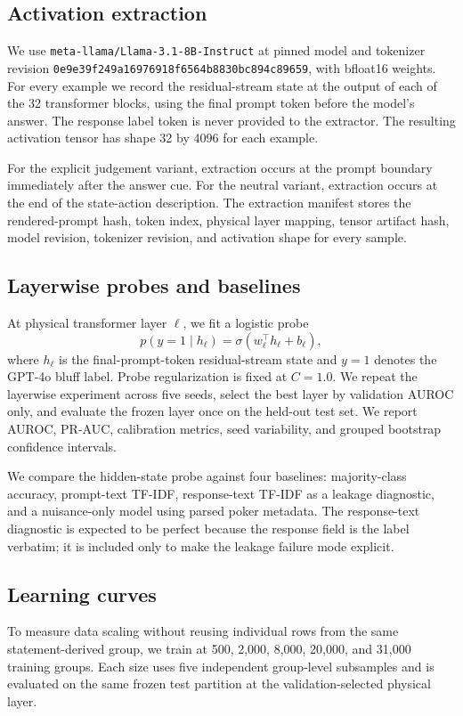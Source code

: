 \subsection{Activation extraction}
We use \texttt{meta-llama/Llama-3.1-8B-Instruct} at pinned model and tokenizer revision \texttt{0e9e39f2\allowbreak 49a1697\allowbreak 6918f6564\allowbreak b8830bc8\allowbreak 94c89659}, with bfloat16 weights. For every example we record the residual-stream state at the output of each of the 32 transformer blocks, using the final prompt token before the model's answer. The response label token is never provided to the extractor. The resulting activation tensor has shape 32 by 4096 for each example.

For the explicit judgement variant, extraction occurs at the prompt boundary immediately after the answer cue. For the neutral variant, extraction occurs at the end of the state-action description. The extraction manifest stores the rendered-prompt hash, token index, physical layer mapping, tensor artifact hash, model revision, tokenizer revision, and activation shape for every sample.

\subsection{Layerwise probes and baselines}
At physical transformer layer $\ell$, we fit a logistic probe
\[
    p(y=1\mid h_\ell)=\sigma(w_\ell^\top h_\ell+b_\ell),
\]
where $h_\ell$ is the final-prompt-token residual-stream state and $y=1$ denotes the GPT-4o bluff label. Probe regularization is fixed at $C=1.0$. We repeat the layerwise experiment across five seeds, select the best layer by validation AUROC only, and evaluate the frozen layer once on the held-out test set. We report AUROC, PR-AUC, calibration metrics, seed variability, and grouped bootstrap confidence intervals.

We compare the hidden-state probe against four baselines: majority-class accuracy, prompt-text TF-IDF, response-text TF-IDF as a leakage diagnostic, and a nuisance-only model using parsed poker metadata. The response-text diagnostic is expected to be perfect because the response field is the label verbatim; it is included only to make the leakage failure mode explicit.

\subsection{Learning curves}
To measure data scaling without reusing individual rows from the same statement-derived group, we train at 500, 2,000, 8,000, 20,000, and 31,000 training groups. Each size uses five independent group-level subsamples and is evaluated on the same frozen test partition at the validation-selected physical layer.

